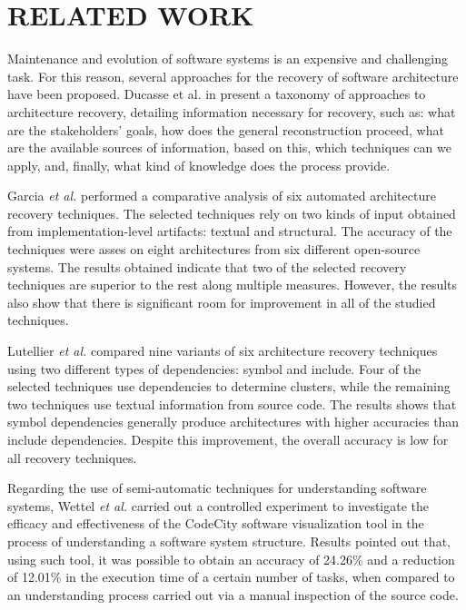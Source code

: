 \section{RELATED WORK}\label{sec:related}

Maintenance and evolution of software systems is an expensive and challenging task. For this reason, several approaches for the recovery of software architecture have been proposed. Ducasse et al. in \cite{ducasse_software_2009} present a taxonomy of approaches to architecture recovery, detailing information necessary for recovery, such as: what are the stakeholders’ goals, how does the general reconstruction proceed, what are the available sources of information, based on this, which techniques can we apply, and, finally, what kind of knowledge does the process provide.

Garcia \textit{et al.} \cite{Garcia:ASE2013} performed a comparative analysis of six automated architecture recovery techniques. The selected techniques rely on two kinds of input obtained from im\-ple\-mentation-level artifacts: textual and structural. The accuracy of the techniques were asses on eight architectures from six different open-source systems. The results obtained indicate that two of the selected recovery techniques are superior to the rest along multiple measures. However, the results also show that there is significant room for improvement in all of the studied techniques.

Lutellier \textit{et al.} \cite{Lutellier_2015} compared nine variants of six architecture recovery techniques using two different types of dependencies: symbol and include. Four of the selected techniques use dependencies to determine clusters, while the remaining two techniques use textual information from source code. The results shows that symbol dependencies generally produce architectures with higher accuracies than include dependencies. Despite this improvement, the overall accuracy is low for all recovery techniques.

Regarding the use of semi-automatic techniques for understanding software systems, Wettel \textit{et al.} \cite{wettel_software_2011} carried out a controlled experiment to investigate the efficacy and effectiveness of the CodeCity software visualization tool in the process of understanding a software system structure. Results pointed out that, using such tool, it was possible to obtain an accuracy of 24.26\% and a reduction of 12.01\% in the execution time of a certain number of tasks, when compared to an understanding process carried out via a manual inspection of the source code.